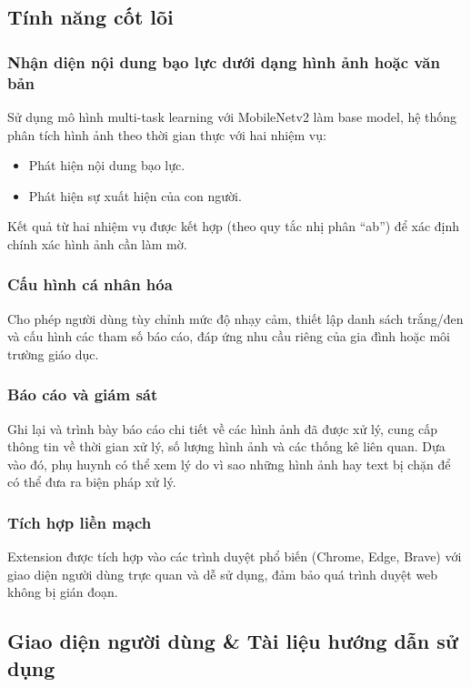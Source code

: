 \documentclass[12pt,a4paper]{article}
\begin{document}
\subsection{Tính năng cốt lõi}

\subsubsection{Nhận diện nội dung bạo lực dưới dạng hình ảnh hoặc văn bản}

Sử dụng mô hình multi-task learning với MobileNetv2 làm base model, hệ thống phân tích hình ảnh theo thời gian thực với hai nhiệm vụ:
\begin{itemize}
  \item Phát hiện nội dung bạo lực.
  \item Phát hiện sự xuất hiện của con người.
\end{itemize}

Kết quả từ hai nhiệm vụ được kết hợp (theo quy tắc nhị phân ``ab'') để xác định chính xác hình ảnh cần làm mờ.

\subsubsection{Cấu hình cá nhân hóa}

Cho phép người dùng tùy chỉnh mức độ nhạy cảm, thiết lập danh sách trắng/đen và cấu hình các tham số báo cáo, đáp ứng nhu cầu riêng của gia đình hoặc môi trường giáo dục.

\subsubsection{Báo cáo và giám sát}

Ghi lại và trình bày báo cáo chi tiết về các hình ảnh đã được xử lý, cung cấp thông tin về thời gian xử lý, số lượng hình ảnh và các thống kê liên quan. Dựa vào đó, phụ huynh có thể xem lý do vì sao những hình ảnh hay text bị chặn để có thể đưa ra biện pháp xử lý.

\subsubsection{Tích hợp liền mạch}

Extension được tích hợp vào các trình duyệt phổ biến (Chrome, Edge, Brave) với giao diện người dùng trực quan và dễ sử dụng, đảm bảo quá trình duyệt web không bị gián đoạn.

\subsection{Giao diện người dùng \& Tài liệu hướng dẫn sử dụng}
\end{document}
